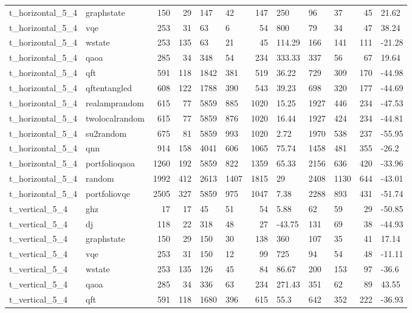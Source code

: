\begin{longtable}{llrrllrlllrl}
t\_horizontal\_5\_4 & graphstate & 150 & 29 & 147 & 42 & 147 & 250 & 96 & 37 & 45 & 21.62 \\
t\_horizontal\_5\_4 & vqe & 253 & 31 & 63 & 6 & 54 & 800 & 79 & 34 & 47 & 38.24 \\
t\_horizontal\_5\_4 & wstate & 253 & 135 & 63 & 21 & 45 & 114.29 & 166 & 141 & 111 & -21.28 \\
t\_horizontal\_5\_4 & qaoa & 285 & 34 & 348 & 54 & 234 & 333.33 & 337 & 56 & 67 & 19.64 \\
t\_horizontal\_5\_4 & qft & 591 & 118 & 1842 & 381 & 519 & 36.22 & 729 & 309 & 170 & -44.98 \\
t\_horizontal\_5\_4 & qftentangled & 608 & 122 & 1788 & 390 & 543 & 39.23 & 698 & 320 & 177 & -44.69 \\
t\_horizontal\_5\_4 & realamprandom & 615 & 77 & 5859 & 885 & 1020 & 15.25 & 1927 & 446 & 234 & -47.53 \\
t\_horizontal\_5\_4 & twolocalrandom & 615 & 77 & 5859 & 876 & 1020 & 16.44 & 1927 & 424 & 234 & -44.81 \\
t\_horizontal\_5\_4 & su2random & 675 & 81 & 5859 & 993 & 1020 & 2.72 & 1970 & 538 & 237 & -55.95 \\
t\_horizontal\_5\_4 & qnn & 914 & 158 & 4041 & 606 & 1065 & 75.74 & 1458 & 481 & 355 & -26.2 \\
t\_horizontal\_5\_4 & portfolioqaoa & 1260 & 192 & 5859 & 822 & 1359 & 65.33 & 2156 & 636 & 420 & -33.96 \\
t\_horizontal\_5\_4 & random & 1992 & 412 & 2613 & 1407 & 1815 & 29 & 2408 & 1130 & 644 & -43.01 \\
t\_horizontal\_5\_4 & portfoliovqe & 2505 & 327 & 5859 & 975 & 1047 & 7.38 & 2288 & 893 & 431 & -51.74 \\
t\_vertical\_5\_4 & ghz & 17 & 17 & 45 & 51 & 54 & 5.88 & 62 & 59 & 29 & -50.85 \\
t\_vertical\_5\_4 & dj & 118 & 22 & 318 & 48 & 27 & -43.75 & 131 & 69 & 38 & -44.93 \\
t\_vertical\_5\_4 & graphstate & 150 & 29 & 150 & 30 & 138 & 360 & 107 & 35 & 41 & 17.14 \\
t\_vertical\_5\_4 & vqe & 253 & 31 & 150 & 12 & 99 & 725 & 94 & 54 & 48 & -11.11 \\
t\_vertical\_5\_4 & wstate & 253 & 135 & 126 & 45 & 84 & 86.67 & 200 & 153 & 97 & -36.6 \\
t\_vertical\_5\_4 & qaoa & 285 & 34 & 336 & 63 & 234 & 271.43 & 351 & 62 & 89 & 43.55 \\
t\_vertical\_5\_4 & qft & 591 & 118 & 1680 & 396 & 615 & 55.3 & 642 & 352 & 222 & -36.93 \\

\end{longtable}
